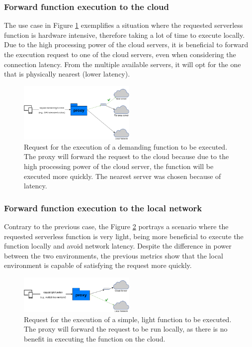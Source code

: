 \documentclass[conference]{IEEEtran}
\begin{document}
\subsubsection{Forward function execution to the cloud} \label{usecases:forward_cloud}

The use case in Figure \ref{fig:succ-cloud-deploy} exemplifies a situation where
the requested serverless function is hardware intensive, therefore taking a lot of
time to execute locally. Due to the high processing power of the cloud servers, it
is beneficial to forward the execution request to one of the cloud servers, even
when considering the connection latency. From the multiple available servers, it
will opt for the one that is physically nearest (lower latency).

\begin{figure}[ht]
  \begin{center}
    \includegraphics[width=0.5\textwidth]{diss-succ-cloud-deploy.png}
    \caption{Request for the execution of a demanding function to be executed. The proxy will forward the request to the cloud because due to the high processing  power of the cloud server, the function will be executed more quickly. The nearest server was chosen because of latency.}
    \label{fig:succ-cloud-deploy}
  \end{center}
\end{figure}

\subsubsection{Forward function execution to the local network}
\label{usecases:forward_local}

Contrary to the previous case, the Figure \ref{fig:succ-local-deploy} portrays a scenario where the requested serverless function is very light, being more beneficial to execute the function locally and avoid network latency. Despite the difference in power between the two environments, the previous metrics show that
the local environment is capable of satisfying the request more quickly.

\begin{figure}[ht]
  \begin{center}
    \includegraphics[width=0.5\textwidth]{diss-succ-local-deploy.png}
    \caption{Request for the execution of a simple, light function to be executed. The proxy will forward the request to be run locally, as there is no benefit in
    executing the function on the cloud.}
    \label{fig:succ-local-deploy}
  \end{center}
\end{figure}
\end{document}
